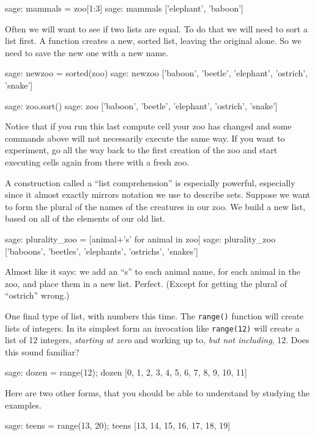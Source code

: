 %
\begin{sageexample}
sage: mammals = zoo[1:3]
sage: mammals
['elephant', 'baboon']
\end{sageexample}
%
Often we will want to see if two lists are equal.  To do that we will need to sort a list first.  A function creates a new, sorted list, leaving the original alone.  So we need to save the new one with a new name.
%
\begin{sageexample}
sage: newzoo = sorted(zoo)
sage: newzoo
['baboon', 'beetle', 'elephant', 'ostrich', 'snake']
\end{sageexample}
%
\begin{sageexample}
sage: zoo.sort()
sage: zoo
['baboon', 'beetle', 'elephant', 'ostrich', 'snake']
\end{sageexample}
%
Notice that if you run this last compute cell your zoo has changed and some commands above will not necessarily execute the same way.  If you want to experiment, go all the way back to the first creation of the zoo and start executing cells again from there with a fresh zoo.\par
%
A construction called a ``list comprehension'' is especially powerful, especially since it almost exactly mirrors notation we use to describe sets.  Suppose we want to form the plural of the names of the creatures in our zoo.  We build a new list, based on all of the elements of our old list.
%
\begin{sageexample}
sage: plurality_zoo = [animal+'s' for animal in zoo]
sage: plurality_zoo
['baboons', 'beetles', 'elephants', 'ostrichs', 'snakes']
\end{sageexample}
%
Almost like it says: we add an ``s'' to each animal name, for each animal in the zoo, and place them in a new list.  Perfect.  (Except for getting the plural of ``ostrich'' wrong.)\par
%
One final type of list, with numbers this time.  The \verb?range()? function will create lists of integers.  In its simplest form an invocation like \verb?range(12)? will create a list of 12 integers, \emph{starting at zero} and working up to, \emph{but not including}, 12.  Does this sound familiar?
%
\begin{sageexample}
sage: dozen = range(12); dozen
[0, 1, 2, 3, 4, 5, 6, 7, 8, 9, 10, 11]
\end{sageexample}
%
Here are two other forms, that you should be able to understand by studying the examples.
%
\begin{sageexample}
sage: teens = range(13, 20); teens
[13, 14, 15, 16, 17, 18, 19]
\end{sageexample}
